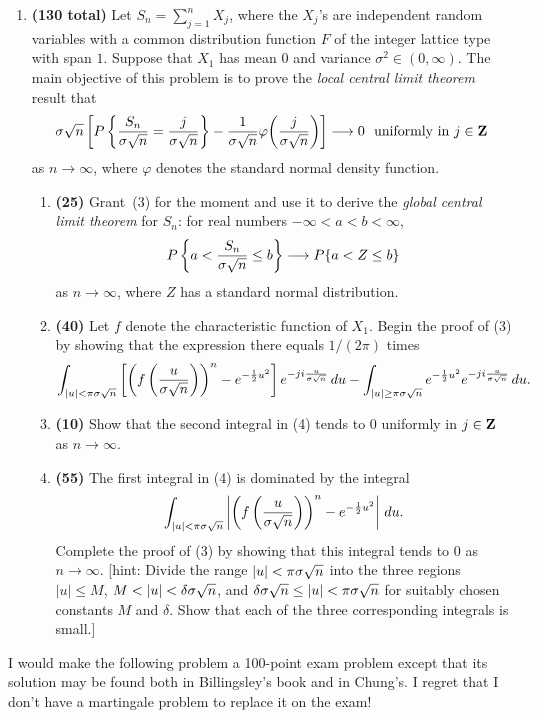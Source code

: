 \begin{enumerate}
\item {\bf (130 total)} Let $S_n = \sum_{j=1}^n X_j$, where the $X_j$'s are
independent random variables with a common distribution function $F$ of the
integer lattice type with span $1$.  Suppose that $X_1$ has mean $0$ and
variance $\sigma^2 \in (0,\infty)$.  The main objective of this problem is to
prove the {\em local central limit theorem\/} result that
\begin{equation}
\sn \left[ P\left\{ \frac{S_n}{\sn} = \frac{j}{\sn} \right\} - \frac{1}{\sn}
\varphi\!\left( \frac{j}{\sn} \right) \right] \longrightarrow 0 \mbox{\ \
uniformly in $j \in \ZZ$} 
\end{equation}
as $n \to \infty$, where $\varphi$ denotes the standard normal density
function.  
 \begin{enumerate}
\item {\bf (25)} Grant~(3) for the moment and use it to derive the {\em global
central limit theorem\/} for $S_n$: for real numbers $-\infty<a<b<\infty$,
$$
P\left\{ a < \frac{S_n}{\sigma \sqrt{n}} \leq b \right\} \longrightarrow P\{a < Z \leq b\}
$$
as $n \to \infty$, where $Z$ has a standard normal distribution.
\item {\bf (40)} Let $f$ denote the characteristic function of $X_1$.  Begin the
proof of (3) by showing that the expression there equals $1/(2 \pi)$ times
\begin{equation}
\int_{|u|< \pi \sigma \sqrt{n}} \left[ \left( f\left(\frac{u}{\sigma \sqrt{n}} \right) \right)^n -
e^{-\frac{1}{2}u^2} \right] e^{-ji \frac{u}{\sigma \sqrt{n}}}\,du - \int_{|u| \geq \pi
\sigma \sqrt{n}} e^{-\frac{1}{2} u^2} e^{-ji \frac{u}{\sigma \sqrt{n}}}\,du.
\end{equation}
\item {\bf (10)} Show that the second integral in (4) tends to $0$ uniformly in $j
\in {\bf Z}$ as $n \to \infty$.
\item {\bf (55)} The first integral in (4) is dominated by the integral
$$
\int_{|u|< \pi \sigma \sqrt{n}} \left| \left( f\left(\frac{u}{\sigma \sqrt{n}} \right) \right)^n -
e^{-\frac{1}{2}u^2} \right|\,du.
$$
Complete the proof of (3) by showing that this integral tends to $0$ as $n
\to \infty$.  [{\sc hint:}  Divide the range $|u| < \pi \sigma \sqrt{n}$ into the three
regions $|u| \leq M$, $M < |u| < \delta \sigma \sqrt{n}$, and $\delta \sigma \sqrt{n} \leq |u| < \pi
\sigma \sqrt{n}$ for suitably chosen constants $M$ and $\delta$.  Show that each of the
three corresponding integrals is small.]   
 \end{enumerate}
 \end{enumerate}
 \bigskip
 \bigskip
 
 I would make the following problem a 100-point exam problem except that its solution
 may be found both in Billingsley's book and in Chung's.  I regret that I don't have
 a martingale problem to replace it on the exam!

